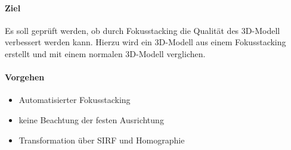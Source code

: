 \documentclass[./00PhotoBox.tex]{subfiles}
\begin{document}
\paragraph{Ziel}
Es soll geprüft werden, ob durch Fokusstacking die Qualität des 3D-Modell verbessert werden kann. Hierzu wird ein 3D-Modell aus einem Fokusstacking erstellt und mit einem normalen 3D-Modell verglichen.

\paragraph{Vorgehen}
\begin{itemize}
    \item Automatisierter Fokusstacking
    \item keine Beachtung der festen Ausrichtung
    \item Transformation über SIRF und Homographie
\end{itemize}

\biblio
\end{document}
